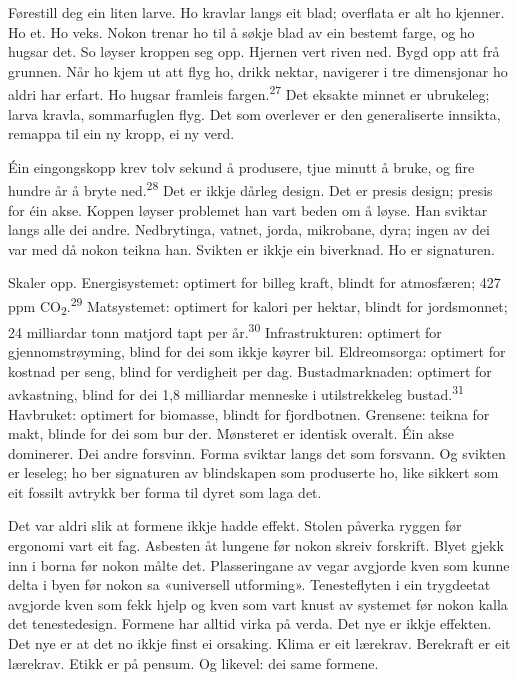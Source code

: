 \begin{widebody}
{\small

Førestill deg ein liten larve. Ho kravlar langs eit blad; overflata er alt ho kjenner. Ho et. Ho veks. Nokon trenar ho til å søkje blad av ein bestemt farge, og ho hugsar det. So løyser kroppen seg opp. Hjernen vert riven ned. Bygd opp att frå grunnen. Når ho kjem ut att flyg ho, drikk nektar, navigerer i tre dimensjonar ho aldri har erfart. Ho hugsar framleis fargen.\textsuperscript{27} Det eksakte minnet er ubrukeleg; larva kravla, sommarfuglen flyg. Det som overlever er den generaliserte innsikta, remappa til ein ny kropp, ei ny verd.

Éin eingongskopp krev tolv sekund å produsere, tjue minutt å bruke, og fire hundre år å bryte ned.\textsuperscript{28} Det er ikkje dårleg design. Det er presis design; presis for éin akse. Koppen løyser problemet han vart beden om å løyse. Han sviktar langs alle dei andre. Nedbrytinga, vatnet, jorda, mikrobane, dyra; ingen av dei var med då nokon teikna han. Svikten er ikkje ein biverknad. Ho er signaturen.

Skaler opp. Energisystemet: optimert for billeg kraft, blindt for atmosfæren; 427 ppm CO\textsubscript{2}.\textsuperscript{29} Matsystemet: optimert for kalori per hektar, blindt for jordsmonnet; 24 milliardar tonn matjord tapt per år.\textsuperscript{30} Infrastrukturen: optimert for gjennomstrøyming, blind for dei som ikkje køyrer bil. Eldreomsorga: optimert for kostnad per seng, blind for verdigheit per dag. Bustadmarknaden: optimert for avkastning, blind for dei 1,8 milliardar menneske i utilstrekkeleg bustad.\textsuperscript{31} Havbruket: optimert for biomasse, blindt for fjordbotnen. Grensene: teikna for makt, blinde for dei som bur der. Mønsteret er identisk overalt. Éin akse dominerer. Dei andre forsvinn. Forma sviktar langs det som forsvann. Og svikten er leseleg; ho ber signaturen av blindskapen som produserte ho, like sikkert som eit fossilt avtrykk ber forma til dyret som laga det.

Det var aldri slik at formene ikkje hadde effekt. Stolen påverka ryggen før ergonomi vart eit fag. Asbesten åt lungene før nokon skreiv forskrift. Blyet gjekk inn i borna før nokon målte det. Plasseringane av vegar avgjorde kven som kunne delta i byen før nokon sa «universell utforming». Tenesteflyten i ein trygdeetat avgjorde kven som fekk hjelp og kven som vart knust av systemet før nokon kalla det tenestedesign. Formene har alltid virka på verda. Det nye er ikkje effekten. Det nye er at det no ikkje finst ei orsaking. Klima er eit lærekrav. Berekraft er eit lærekrav. Etikk er på pensum. Og likevel: dei same formene.

}
\end{widebody}
